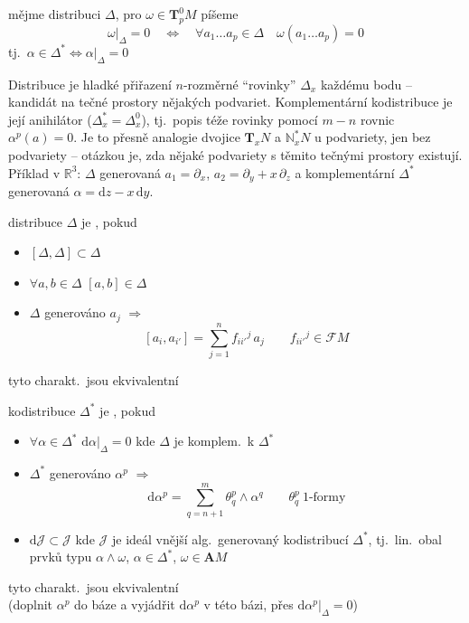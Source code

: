 mějme distribuci $\Delta$, pro $\omega\in\mathbf{T}^0_pM$ píšeme
\[
  \omega|_\Delta = 0 \quad\Leftrightarrow\quad \forall a_1\dots a_p\in\Delta \quad \omega(a_1\dots a_p) = 0
\]
tj.\ $\alpha\in\Delta^*\Leftrightarrow\alpha|_\Delta = 0$

\begin{vysvetleni}
Distribuce je hladké přiřazení $n$-rozměrné ``rovinky'' $\Delta_x$ každému bodu -- kandidát na tečné prostory nějakých podvariet. Komplementární kodistribuce je její anihilátor ($\Delta^*_x=\Delta_x^{0}$), tj.\ popis téže rovinky pomocí $m-n$ rovnic $\alpha^{p}(a)=0$. Je to přesně analogie dvojice $\mathbf{T}_xN$ a $\mathbb{N}^*_xN$ u podvariety, jen bez podvariety -- otázkou je, zda nějaké podvariety s těmito tečnými prostory existují.
Příklad v $\mathbb{R}^3$: $\Delta$ generovaná $a_1=\partial_x$, $a_2=\partial_y+x\,\partial_z$ a komplementární $\Delta^*$ generovaná $\alpha=\mathrm{d}z-x\,\mathrm{d}y$.
\end{vysvetleni}

\begin{definice}
distribuce $\Delta$ je , pokud
\begin{itemize}[nosep]
  \item $[\Delta,\Delta]\subset\Delta$
  \item $\forall a,b\in\Delta$ \quad $[a,b]\in\Delta$
  \item $\Delta$ generováno $a_j$ $\Rightarrow$
        \[ [a_i,a_{i'}] = \sum_{j=1}^{n}f_{ii'}{}^{j}\,a_j \qquad f_{ii'}{}^{j}\in\mathcal{F}M \]
\end{itemize}
tyto charakt.\ jsou ekvivalentní
\end{definice}

\begin{definice}
kodistribuce $\Delta^*$ je , pokud
\begin{itemize}[nosep]
  \item $\forall\alpha\in\Delta^*$ \quad $\mathrm{d}\alpha|_\Delta = 0$ \quad kde $\Delta$ je komplem.\ k $\Delta^*$
  \item $\Delta^*$ generováno $\alpha^{p}$ $\Rightarrow$
        \[ \mathrm{d}\alpha^{p} = \sum_{q=n+1}^{m}\theta^{p}_{q}\wedge\alpha^{q} \qquad \theta^{p}_{q}\ \text{1-formy} \]
  \item $\mathrm{d}\mathcal{J}\subset\mathcal{J}$ \quad kde $\mathcal{J}$ je ideál vnější alg.\ generovaný kodistribucí $\Delta^*$, tj.\ lin.\ obal prvků typu $\alpha\wedge\omega$, $\alpha\in\Delta^*$, $\omega\in\mathbf{A}M$
\end{itemize}
tyto charakt.\ jsou ekvivalentní \\
(doplnit $\alpha^{p}$ do báze a vyjádřit $\mathrm{d}\alpha^{p}$ v této bázi, přes $\mathrm{d}\alpha^{p}|_\Delta = 0$)
\end{definice}

